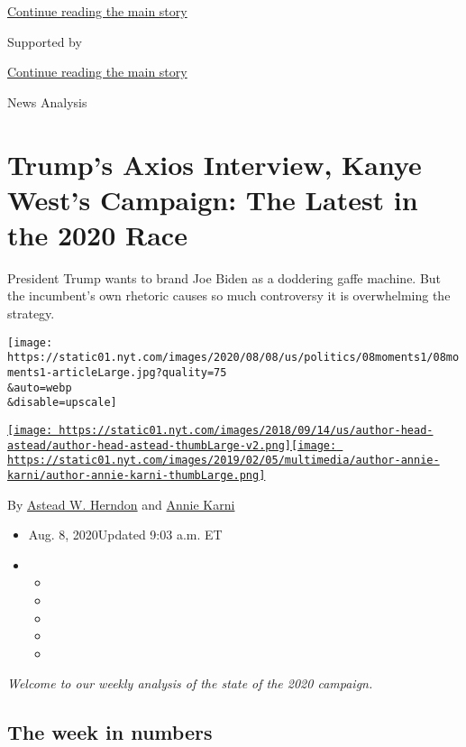 \protect\hyperlink{after-top}{Continue reading the main story}

Supported by

\protect\hyperlink{after-sponsor}{Continue reading the main story}

News Analysis

\hypertarget{trumps-axios-interview-kanye-wests-campaign-the-latest-in-the-2020-race}{%
\section{Trump's Axios Interview, Kanye West's Campaign: The Latest in
the 2020
Race}\label{trumps-axios-interview-kanye-wests-campaign-the-latest-in-the-2020-race}}

President Trump wants to brand Joe Biden as a doddering gaffe machine.
But the incumbent's own rhetoric causes so much controversy it is
overwhelming the strategy.

\texttt{[image: https://static01.nyt.com/images/2020/08/08/us/politics/08moments1/08moments1-articleLarge.jpg?quality=75\\\&auto=webp\\\&disable=upscale]}

\href{https://www.nytimes.com/by/astead-w-herndon}{\texttt{[image: https://static01.nyt.com/images/2018/09/14/us/author-head-astead/author-head-astead-thumbLarge-v2.png]}}\href{https://www.nytimes.com/by/annie-karni}{\texttt{[image: https://static01.nyt.com/images/2019/02/05/multimedia/author-annie-karni/author-annie-karni-thumbLarge.png]}}

By \href{https://www.nytimes.com/by/astead-w-herndon}{Astead W. Herndon}
and \href{https://www.nytimes.com/by/annie-karni}{Annie Karni}

\begin{itemize}
\item
  Aug. 8, 2020Updated 9:03 a.m. ET
\item
  \begin{itemize}
  \item
  \item
  \item
  \item
  \item
  \end{itemize}
\end{itemize}

\emph{Welcome to our weekly analysis of the state of the 2020 campaign.}

\hypertarget{the-week-in-numbers}{%
\subsection{The week in numbers}\label{the-week-in-numbers}}

